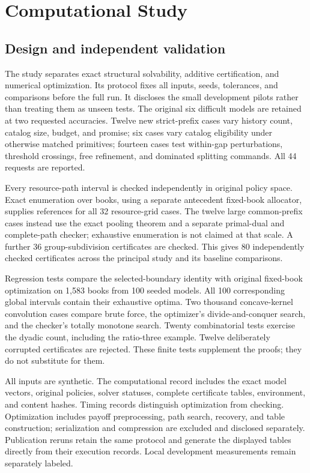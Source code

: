 \section{Computational Study}\label{sec:study52}
\subsection{Design and independent validation}
The study separates exact structural solvability, additive certification, and numerical optimization. Its protocol fixes all inputs, seeds, tolerances, and comparisons before the full run. It discloses the small development pilots rather than treating them as unseen tests. The original six difficult models are retained at two requested accuracies. Twelve new strict-prefix cases vary history count, catalog size, budget, and promise; six cases vary catalog eligibility under otherwise matched primitives; fourteen cases test within-gap perturbations, threshold crossings, free refinement, and dominated splitting commands. All 44 requests are reported.

Every resource-path interval is checked independently in original policy space. Exact enumeration over books, using a separate antecedent fixed-book allocator, supplies references for all 32 resource-grid cases. The twelve large common-prefix cases instead use the exact pooling theorem and a separate primal-dual and complete-path checker; exhaustive enumeration is not claimed at that scale. A further 36 group-subdivision certificates are checked. This gives 80 independently checked certificates across the principal study and its baseline comparisons.

Regression tests compare the selected-boundary identity with original fixed-book optimization on 1,583 books from 100 seeded models. All 100 corresponding global intervals contain their exhaustive optima. Two thousand concave-kernel convolution cases compare brute force, the optimizer's divide-and-conquer search, and the checker's totally monotone search. Twenty combinatorial tests exercise the dyadic count, including the ratio-three example. Twelve deliberately corrupted certificates are rejected. These finite tests supplement the proofs; they do not substitute for them.

All inputs are synthetic. The computational record includes the exact model vectors, original policies, solver statuses, complete certificate tables, environment, and content hashes. Timing records distinguish optimization from checking. Optimization includes payoff preprocessing, path search, recovery, and table construction; serialization and compression are excluded and disclosed separately. Publication reruns retain the same protocol and generate the displayed tables directly from their execution records. Local development measurements remain separately labeled.

